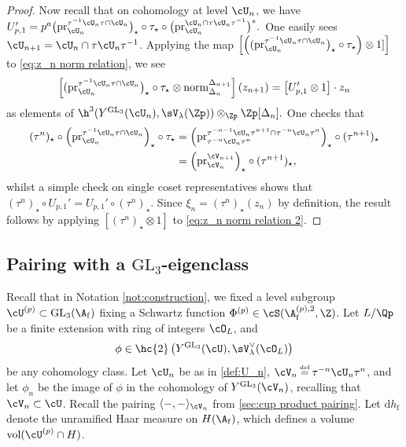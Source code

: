 \documentclass[10pt,reqno,a4paper]{amsart}
\newcommand{\subf}{_{\mathrm{f}}}
\newcommand{\GL}{\mathrm{GL}}
\begin{document}
\begin{proof}
Now recall that on cohomology at level $\cU_n$, we have	$U_{p,1}' = p^{a} \big(\mathrm{pr}^{\tau^{-1} \cU_n \tau \cap \cU_n}_{\cU_n}\big)_\star\circ \tau_\star \circ \big(\mathrm{pr}_{\cU_n}^{\cU_n \cap \tau \cU_n\tau^{-1}} \big)^*.$
One easily sees $\cU_{n+1} = \cU_n \cap \tau \cU_n\tau^{-1}$. Applying the map $\left[\left((\mathrm{pr}^{\tau^{-1} \cU_n \tau \cap \cU_n}_{\cU_n}\big)_\star\circ \tau_\star \right)\otimes 1]\right]$ to \eqref{eq:z_n norm relation}, we see
\begin{equation}\label{eq:z_n norm relation 2}
	\left[(\mathrm{pr}^{\tau^{-1} \cU_n \tau \cap \cU_n}_{\cU_n}\big)_\star\circ \tau_\star \otimes  \operatorname{norm}_{\Delta_n}^{\Delta_{n+1}}\right] (z_{n+1}) = \left[U_{p,1}' \otimes 1\right] \cdot z_n
\end{equation}
as elements of $\h^3(Y^{\GL_3}(\cU_{n}), \sV_\lambda(\Zp)) \otimes_{\Zp} \Zp[\Delta_n].$ One checks that
\begin{align*}
	(\tau^n)_\star \circ 	\left(\mathrm{pr}^{\tau^{-1} \cU_n \tau \cap \cU_n}_{\cU_n}\right)_\star \circ \tau_\star &= 	\left(\mathrm{pr}^{\tau^{-n-1} \cU_n \tau^{n+1} \cap \tau^{-n}\cU_n\tau^n }_{\tau^{-n}\cU_n\tau^n}\right)_\star \circ (\tau^{n+1})_\star\\
	&= \left(\mathrm{pr}_{\cV_n}^{\cV_{n+1}}\right)_\star \circ (\tau^{n+1})_\star,
\end{align*}
whilst a simple check on single coset representatives shows that $(\tau^n)_\star \circ U_{p,1}' = U_{p,1}' \circ (\tau^n)_\star$. Since $\xi_n = (\tau^n)_\star(z_n)$ by definition, the result follows by applying $[(\tau^n)_\star \otimes 1]$ to \eqref{eq:z_n norm relation 2}.
\end{proof}



\subsection{Pairing with a \texorpdfstring{$\GL_3$}{GL3}-eigenclass}\label{sec:pairing with cusp form}




Recall that in Notation \ref{not:construction}, we fixed a level subgroup $\cU^{(p)} \subset \GL_3(\A\subf)$ fixing a Schwartz function $\Phi^{(p)} \in \cS(\A\subf^{(p),2},\Z)$. Let $L/\Qp$ be a finite extension with ring of integers $\cO_L$, and
\[
\phi \in \hc{2}\left(Y^{\GL_3}(\cU),\sV_\lambda^\vee(\cO_L)\right)
\]
be any cohomology class. Let $\cU_n$ be as in \cref{def:U_n}, $\cV_n \defeq \tau^{-n}\cU_n\tau^n$, and let $\phi_n$ be the image of $\phi$ in the cohomology of $Y^{\GL_3}(\cV_n)$, recalling that $\cV_n\subset\cU$. Recall the pairing $\langle-,-\rangle_{\cV_n}$ from \cref{sec:cup product pairing}. Let $\mathrm{d}h\subf$ denote the unramified Haar measure on $H(\A\subf)$, which defines a volume $\mathrm{vol}(\cU^{(p)}\cap H)$.
\end{document}
